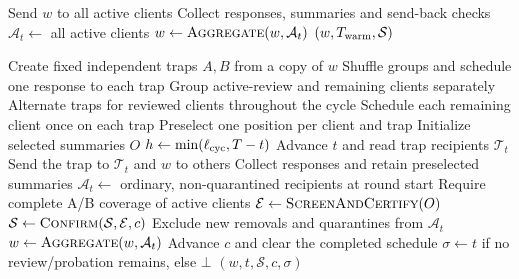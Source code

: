 \begin{algorithm}[!htb]
\caption{Phase I: ordinary warmup}\label{alg:warmup}
\begin{algorithmic}[1]\small
{}
  \State Send $w$ to all active clients\label{ln:warm:send}
  \State Collect responses, summaries and send-back checks
  \State $\mathcal A_t\gets$ all active clients
  \State $w\gets\Call{Aggregate}{w,\mathcal A_t}$\label{ln:warm:aggregate}
 \EndFor
 \State \Return $(w,T_{\rm warm},\mathcal S)$
\EndProcedure
\end{algorithmic}
\end{algorithm}

\begin{algorithm}[!htb]
\caption{Phase II: collect and assess paired responses}\label{alg:paired}
\begin{algorithmic}[1]\small
{}
 \State Create fixed independent traps $A,B$ from a copy of $w$
  \State Shuffle groups and schedule one response to each trap
 \Else
  \State Group active-review and remaining clients separately
  \State Alternate traps for reviewed clients throughout the cycle
  \State Schedule each remaining client once on each trap
 \EndIf
 \State Preselect one position per client and trap\label{ln:paired:select}
 \State Initialize selected summaries $O$
 \State $h\gets\min(\ell_{\rm cyc},T-t)$
  \State Advance $t$ and read trap recipients $\mathcal T_t$
  \State Send the trap to $\mathcal T_t$ and $w$ to others
  \State Collect responses and retain preselected summaries
  \State $\mathcal A_t\gets$ ordinary, non-quarantined recipients at round start
   \State Require complete A/B coverage of active clients
   \State $\mathcal E\gets\Call{ScreenAndCertify}{O}$\label{ln:paired:screen}
   \State $\mathcal S\gets\Call{Confirm}{\mathcal S,\mathcal E,c}$\label{ln:paired:confirm}
   \State Exclude new removals and quarantines from $\mathcal A_t$\label{ln:paired:filter}
  \EndIf
  \State $w\gets\Call{Aggregate}{w,\mathcal A_t}$
 \EndFor
  \State Advance $c$ and clear the completed schedule
  \State $\sigma\gets t$ if no review/probation remains, else $\bot$
 \EndIf
 \State \Return $(w,t,\mathcal S,c,\sigma)$
\EndProcedure
\end{algorithmic}
\end{algorithm}

